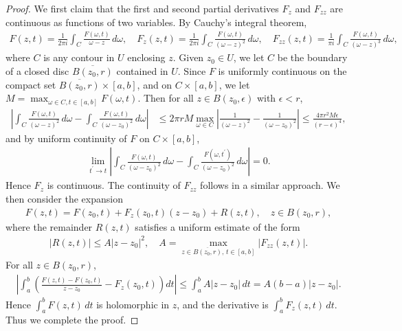 \documentclass{article}
\numberwithin{equation}{section}
\newcommand{\ol}{\overline}
\theoremstyle{plain}
\theoremstyle{definition}
\begin{document}
\begin{proof}
We first claim that the first and second partial derivatives $F_z$ and $F_{zz}$ are continuous as functions of two variables. By Cauchy's integral theorem,
\begin{align*}
	F(z,t)=\frac{1}{2\pi i}\int_C\frac{F(\omega,t)}{\omega-z}\,d\omega,\quad F_z(z,t)=\frac{1}{2\pi i}\int_C\frac{F(\omega,t)}{(\omega-z)^2}\,d\omega,\quad F_{zz}(z,t)=\frac{1}{\pi i}\int_C\frac{F(\omega,t)}{(\omega-z)^3}\,d\omega,
\end{align*}
where $C$ is any contour in $U$ enclosing $z$. Given $z_0\in U$, we let $C$ be the boundary of a closed disc $\ol{B(z_0,r)}$ contained in $U$. Since $F$ is uniformly continuous on the compact set $\ol{B(z_0,r)}\times[a,b]$, and on $C\times [a,b]$, we let $M=\max_{\omega\in C,t\in[a,b]}F(\omega,t)$. Then for all $z\in B(z_0,\epsilon)$ with $\epsilon<r$,
\begin{align*}
\left\vert\int_C\frac{F(\omega,t)}{(\omega-z)^2}\,d\omega-\int_C\frac{F(\omega,t)}{(\omega-z_0)^2}\,d\omega\right\vert&\leq 2\pi rM\max_{\omega\in C}\left\vert\frac{1}{(\omega-z)^2}-\frac{1}{(\omega-z_0)^2}\right\vert\leq\frac{4\pi r^2M\epsilon}{(r-\epsilon)^4},
\end{align*}
and by uniform continuity of $F$ on $C\times[a,b]$,
\begin{align*}
	\lim_{t^\prime\to t}\left\vert\int_C\frac{F(\omega,t)}{(\omega-z_0)^2}\,d\omega-\int_C\frac{F(\omega,t^\prime)}{(\omega-z_0)^2}\,d\omega\right\vert=0.
\end{align*}
Hence $F_z$ is continuous. The continuity of $F_{zz}$ follows in a similar approach. We then consider the expansion
\begin{align*}
	F(z,t)=F(z_0,t)+F_z(z_0,t)(z-z_0)+R(z,t),\quad z\in B(z_0,r),
\end{align*}
where the remainder $R(z,t)$ satisfies a uniform estimate of the form
\begin{align*}
	\left\vert R(z,t)\right\vert\leq A\vert z-z_0\vert^2, \quad A=\max_{z\in \ol{B(z_0,r)},\,t\in[a,b]}\vert F_{zz}(z,t)\vert.
\end{align*}
For all $z\in B(z_0,r)$,
\begin{align*}
	\left\vert\int_a^b\left(\frac{F(z,t)-F(z_0,t)}{z-z_0}- F_z(z_0,t)\right)dt\right\vert\leq\int_a^b A\vert z-z_0\vert\,dt=A(b-a)\vert z-z_0\vert.
\end{align*}
Hence $\int_a^b F(z,t)\,dt$ is holomorphic in $z$, and the derivative is $\int_a^b F_z(z,t)\,dt$. Thus we complete the proof.
\end{proof}
\end{document}

